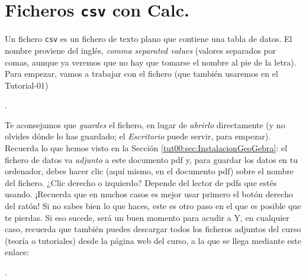 \documentclass[10pt,a4paper]{article}\usepackage[]{graphicx}\usepackage[]{color}
\newcounter {cont01}
\begin{document}
\section{Ficheros {\tt csv} con Calc.}
\label{tut00:sec:FicherosCsvConCalc}

Un fichero {\tt csv} es un fichero de texto plano que contiene una tabla de datos. El nombre
proviene del inglés, {\em comma separated values} (valores separados por comas, aunque ya veremos
que no hay que tomarse el nombre al pie de la letra).  Para empezar, vamos a trabajar con el
fichero (que también usaremos en el Tutorial-01)
\begin{center}
.
\end{center}
Te aconsejamos que {\em guardes} el fichero, en lugar de {\em abrirlo} directamente (y no olvides
dónde lo has guardado; el {\em Escritorio} puede servir, para empezar). Recuerda lo que hemos
visto en la Sección \ref{tut00:sec:InstalacionGeoGebra}: el fichero de datos va {\em adjunto} a
este documento pdf y, para guardar los datos en tu ordenador, debes hacer clic (aquí mismo, en el
documento pdf) sobre el nombre del fichero. ¿Clic derecho o izquierdo? Depende del lector de pdfs
que estés usando. ¡Recuerda que en muchos casos es mejor usar primero el botón derecho del ratón!
Si no sabes bien lo que haces, este es otro paso en el que es posible que te pierdas. Si eso
sucede, será un buen momento para acudir a  Y, en cualquier caso, recuerda
que también puedes descargar todos los ficheros adjuntos del curso (teoría o tutoriales) desde la
página web del curso, a la que se llega mediante este enlace:
\begin{center}
.
\end{center}
\end{document}
